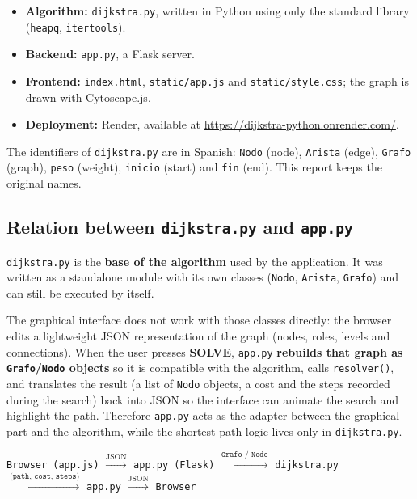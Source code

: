 \documentclass[11pt,letterpaper]{article}
\newcommand{\code}[1]{\texttt{#1}}
\newcommand{\renderlink}{\url{https://dijkstra-python.onrender.com/}}
\begin{document}
\begin{itemize}[nosep]
  \item \textbf{Algorithm:} \code{dijkstra.py}, written in Python using only
        the standard library (\code{heapq}, \code{itertools}).
  \item \textbf{Backend:} \code{app.py}, a Flask server.
  \item \textbf{Frontend:} \code{index.html}, \code{static/app.js} and
        \code{static/style.css}; the graph is drawn with Cytoscape.js.
  \item \textbf{Deployment:} Render, available at \renderlink.
\end{itemize}

The identifiers of \code{dijkstra.py} are in Spanish: \code{Nodo} (node),
\code{Arista} (edge), \code{Grafo} (graph), \code{peso} (weight),
\code{inicio} (start) and \code{fin} (end). This report keeps the original
names.

\subsection{Relation between \code{dijkstra.py} and \code{app.py}}

\code{dijkstra.py} is the \textbf{base of the algorithm} used by the
application. It was written as a standalone module with its own classes
(\code{Nodo}, \code{Arista}, \code{Grafo}) and can still be executed by
itself.

The graphical interface does not work with those classes directly: the
browser edits a lightweight JSON representation of the graph (nodes, roles,
levels and connections). When the user presses \textbf{SOLVE},
\code{app.py} \textbf{rebuilds that graph as \code{Grafo}/\code{Nodo}
objects} so it is compatible with the algorithm, calls \code{resolver()},
and translates the result (a list of \code{Nodo} objects, a cost and the
steps recorded during the search) back into JSON so the interface can
animate the search and highlight the path. Therefore \code{app.py}
acts as the adapter between the graphical part and the algorithm, while the
shortest-path logic lives only in \code{dijkstra.py}.

\begin{center}
\small
\texttt{Browser (app.js)} $\xrightarrow{\text{JSON}}$
\texttt{app.py (Flask)} $\xrightarrow{\texttt{Grafo / Nodo}}$
\texttt{dijkstra.py} $\xrightarrow{\texttt{(path, cost, steps)}}$
\texttt{app.py} $\xrightarrow{\text{JSON}}$ \texttt{Browser}
\end{center}
\end{document}
